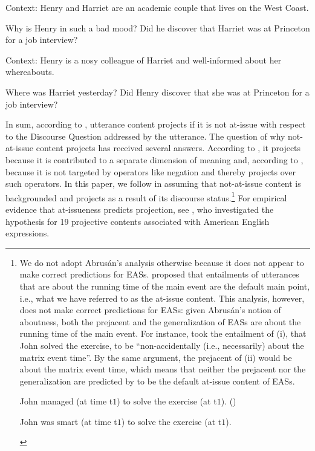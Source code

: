 \documentclass[11pt,fleqn]{article}
\newcommand{\6}{\mbox{$[\hspace*{-.6mm}[$}}
\newcommand{\9}{\mbox{$]\hspace*{-.6mm}]$}}
\begin{document}
\begin{exe}
\ex\label{discover3}
\begin{xlist}

\ex Context: Henry and Harriet are an academic couple that lives on the West Coast. 
\begin{xlist}
 Why is Henry in such a bad mood?
 Did he discover that Harriet was at Princeton for a job interview?
\end{xlist}

\ex Context: Henry is a nosy colleague of Harriet and well-informed about her whereabouts.
\begin{xlist}
 Where was Harriet yesterday?
 Did Henry discover that she was at Princeton for a job interview?
\end{xlist}

\end{xlist}
\end{exe}
In sum, according to \citealt{best-question}, utterance content projects if it is not at-issue with respect to the Discourse Question addressed by the utterance. The question of why not-at-issue content projects has received several answers. According to \citet{potts05}, it projects because it is contributed to a separate dimension of meaning and, according to \citet{brst-salt10}, because it is not targeted by operators like negation and thereby projects over such operators. In this paper, we follow \citealt{abrusan2011,abrusan2016} in assuming that not-at-issue content is backgrounded and projects as a result of its discourse status.\footnote{We do not adopt Abrus\'an's analysis otherwise because it does not appear to make correct predictions for EASs. \citet{abrusan2011} proposed that entailments of utterances that are about the running time of the main event are the default main point, i.e., what we have referred to as the at-issue content. This analysis, however, does not make correct predictions for EASs: given Abrus\'an's notion of aboutness, both the prejacent and the generalization of EASs are about the running time of the main event. For instance, \citet[508]{abrusan2011} took the entailment of (i), that John solved the exercise, to be ``non-accidentally (i.e., necessarily) about the matrix event time''. By the same argument, the prejacent of (ii) would be about the matrix event time, which means that neither the prejacent nor the generalization are predicted by \citealt{abrusan2011} to be the default at-issue content of EASs.

\begin{exe}
 John managed (at time t$ {\mbox{1}}$) to solve the exercise (at t$ {\mbox{1}}$). \hfill (\citealt[508]{abrusan2011})

 John was smart (at time t$ {\mbox{1}}$) to solve the exercise (at t$ {\mbox{1}}$).

\end{exe}} For empirical evidence that at-issueness predicts projection, see \citealt{tbd-variability}, who investigated the hypothesis for 19 projective contents associated with American English expressions. 
\end{document}
